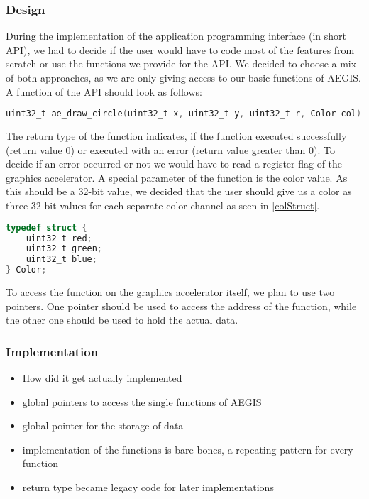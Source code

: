 \subsubsection*{Design}

During the implementation of the application programming interface (in short API), we had to decide if the user would have to code most of the features from scratch or use the functions we provide for the API.
We decided to choose a mix of both approaches, as we are only giving access to our basic functions of AEGIS. A function of the API should look as follows:
\begin{lstlisting}[language=C, caption={The Circle Drawing Function}, label=CircDraw]
uint32_t ae_draw_circle(uint32_t x, uint32_t y, uint32_t r, Color col);
\end{lstlisting}
The return type of the function indicates, if the function executed successfully (return value \(0\)) or executed with an error (return value greater than \(0\)). To decide if an error occurred or not we would have to read a register flag of the graphics accelerator. A special parameter of the function is the color value. As this should be a 32-bit value, we decided that the user should give us a color as three 32-bit values for each separate color channel as seen in \cref{colStruct}.
\begin{lstlisting}[language=C, caption={The Color Stuct}, label=colStruct]
typedef struct {
	uint32_t red;
	uint32_t green;
	uint32_t blue;
} Color;
\end{lstlisting}

To access the function on the graphics accelerator itself, we plan to use two pointers. One pointer should be used to access the address of the function, while the other one should be used to hold the actual data. 

\subsubsection*{Implementation}

\begin{itemize}
	\item How did it get actually implemented
	\item global pointers to access the single functions of AEGIS
	\item global pointer for the storage of data
	\item implementation of the functions is bare bones, a repeating pattern for every function
	\item return type became legacy code for later implementations
\end{itemize}